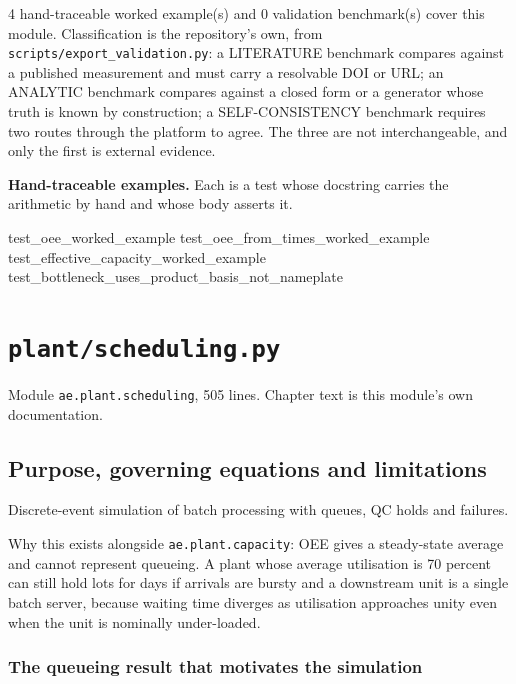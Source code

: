 \documentclass[10pt,a4paper,twoside]{report}
\begin{document}
4 hand-traceable worked example(s) and 0 validation benchmark(s) cover this module. Classification is the repository's own, from \texttt{scripts/export\_validation.py}: a LITERATURE benchmark compares against a published measurement and must carry a resolvable DOI or URL; an ANALYTIC benchmark compares against a closed form or a generator whose truth is known by construction; a SELF-CONSISTENCY benchmark requires two routes through the platform to agree. The three are not interchangeable, and only the first is external evidence.

\textbf{Hand-traceable examples.} Each is a test whose docstring carries the arithmetic by hand and whose body asserts it.

\begin{verbatimsmall}
test_oee_worked_example
test_oee_from_times_worked_example
test_effective_capacity_worked_example
test_bottleneck_uses_product_basis_not_nameplate
\end{verbatimsmall}

\clearpage

\chapter{\texttt{plant/scheduling.py}}\label{ch:scheduling}


{\footnotesize\color{slate}Module \texttt{ae.plant.scheduling}, 505 lines. Chapter text is this module's own documentation.\par}

\section{Purpose, governing equations and limitations}

Discrete-event simulation of batch processing with queues, QC holds and failures.

Why this exists alongside \texttt{ae.plant.capacity}: OEE gives a steady-state average and cannot represent queueing. A plant whose average utilisation is 70 percent can still hold lots for days if arrivals are bursty and a downstream unit is a single batch server, because waiting time diverges as utilisation approaches unity even when the unit is nominally under-loaded.

\subsection*{The queueing result that motivates the simulation}
\end{document}
